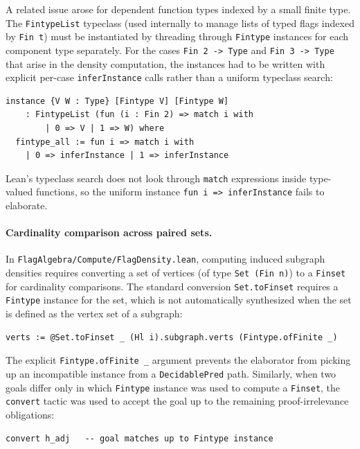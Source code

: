 \documentclass{article}
\newcommand{\lean}[1]{\texttt{#1}}
\begin{document}
A related issue arose for dependent function types indexed by a small finite
type.  The \lean{FintypeList} typeclass (used internally to manage lists of
typed flags indexed by \lean{Fin t}) must be instantiated by threading through
\lean{Fintype} instances for each component type separately.  For the cases
\lean{Fin 2 -> Type} and \lean{Fin 3 -> Type} that arise in the density
computation, the instances had to be written with explicit per-case
\lean{inferInstance} calls rather than a uniform typeclass search:
\begin{lstlisting}
instance {V W : Type} [Fintype V] [Fintype W]
    : FintypeList (fun (i : Fin 2) => match i with
        | 0 => V | 1 => W) where
  fintype_all := fun i => match i with
    | 0 => inferInstance | 1 => inferInstance
\end{lstlisting}
Lean's typeclass search does not look through \lean{match} expressions inside
type-valued functions, so the uniform instance \lean{fun i => inferInstance}
fails to elaborate.

\paragraph{Cardinality comparison across paired sets.}
In \lean{FlagAlgebra/Compute/FlagDensity.lean}, computing induced subgraph
densities requires
converting a set of vertices (of type \lean{Set (Fin n)}) to a \lean{Finset}
for cardinality comparisons.  The standard conversion
\lean{Set.toFinset} requires a \lean{Fintype} instance for the set, which is
not automatically synthesized when the set is defined as the vertex set of a
subgraph:
\begin{lstlisting}
verts := @Set.toFinset _ (Hl i).subgraph.verts (Fintype.ofFinite _)
\end{lstlisting}
The explicit \lean{Fintype.ofFinite \_} argument prevents the elaborator from
picking up an incompatible instance from a \lean{DecidablePred} path.
Similarly, when two goals differ only in which \lean{Fintype} instance was
used to compute a \lean{Finset}, the \lean{convert} tactic was used to accept
the goal up to the remaining proof-irrelevance obligations:
\begin{lstlisting}
convert h_adj   -- goal matches up to Fintype instance
\end{lstlisting}
\end{document}
